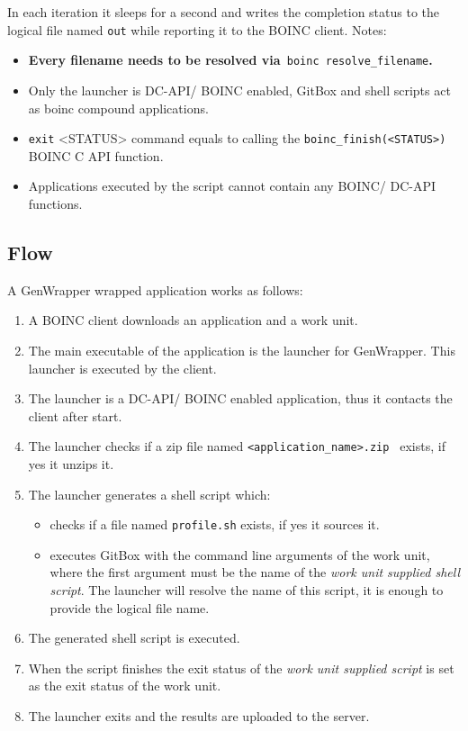 \documentclass[a4paper,12pt,titlepage,dvipdfm]{article}
\begin{document}
In each iteration it sleeps for a second and writes the completion status to the logical file named \texttt{out} while reporting it to the BOINC client. Notes:
\begin{itemize}
    \item \textbf{Every filename needs to be resolved via}\texttt{ boinc resolve\_filename}\textbf{.}
    \item Only the launcher is DC-API/ BOINC enabled, GitBox and shell scripts act as boinc compound applications.
    \item \texttt{exit} <STATUS> command equals to calling the \texttt{boinc\_finish(<STATUS>)} BOINC C API function.
    \item Applications executed by the script cannot contain any BOINC/ DC-API functions.
\end{itemize}

\subsection{Flow}

A GenWrapper wrapped application works as follows:
\begin{enumerate}
    \item A BOINC client downloads an application and a work unit.
    \item The main executable of the application is the launcher for GenWrapper. This launcher is executed by the client.
    \item The launcher is a DC-API/ BOINC enabled application, thus it contacts the client after start.
    \item The launcher checks if a zip file named \texttt{<application\_name>.zip } exists, if yes it unzips it.
    \item The launcher generates a shell script which:
        \begin{itemize}
            \item checks if a file named \texttt{profile.sh} exists, if yes it sources it.
            \item executes GitBox with the command line arguments of the work unit, where the first argument must be the name of the \emph{work unit supplied shell script}. The launcher will resolve the name of this script, it is enough to provide the logical file name.
        \end{itemize}
    
    \item The generated shell script is executed.
    \item When the script finishes the exit status of the \emph{work unit supplied script} is set as the exit status of the work unit.
    \item The launcher exits and the results are uploaded to the server.
\end{enumerate}
\end{document}
